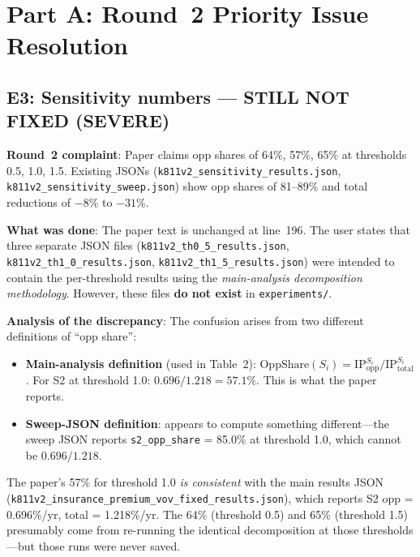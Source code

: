 \documentclass[12pt,a4paper]{article}
\begin{document}
\section*{Part A: Round~2 Priority Issue Resolution}

\subsection*{\textcolor{errorred}{E3: Sensitivity numbers --- STILL NOT FIXED (SEVERE)}}

\textbf{Round~2 complaint}: Paper claims opp shares of 64\%, 57\%, 65\% at thresholds 0.5, 1.0, 1.5. Existing JSONs (\texttt{k811v2\_sensitivity\_results.json}, \texttt{k811v2\_sensitivity\_sweep.json}) show opp shares of 81--89\% and total reductions of $-8\%$ to $-31\%$.

\textbf{What was done}: The paper text is unchanged at line~196. The user states that three separate JSON files (\texttt{k811v2\_th0\_5\_results.json}, \texttt{k811v2\_th1\_0\_results.json}, \texttt{k811v2\_th1\_5\_results.json}) were intended to contain the per-threshold results using the \emph{main-analysis decomposition methodology}. However, these files \textbf{do not exist} in \texttt{experiments/}.

\textbf{Analysis of the discrepancy}: The confusion arises from two different definitions of ``opp share'':

\begin{itemize}[leftmargin=2em]
\item \textbf{Main-analysis definition} (used in Table~2): $\text{OppShare}(S_i) = \text{IP}_{\text{opp}}^{S_i} / \text{IP}_{\text{total}}^{S_i}$. For S2 at threshold 1.0: $0.696 / 1.218 = 57.1\%$. This is what the paper reports.
\item \textbf{Sweep-JSON definition}: appears to compute something different---the sweep JSON reports \texttt{s2\_opp\_share} = 85.0\% at threshold 1.0, which cannot be $0.696/1.218$.
\end{itemize}

The paper's 57\% for threshold 1.0 \emph{is consistent} with the main results JSON (\texttt{k811v2\_insurance\_premium\_vov\_fixed\_results.json}), which reports S2 opp = 0.696\%/yr, total = 1.218\%/yr. The 64\% (threshold 0.5) and 65\% (threshold 1.5) presumably come from re-running the identical decomposition at those thresholds---but those runs were never saved.
\end{document}
